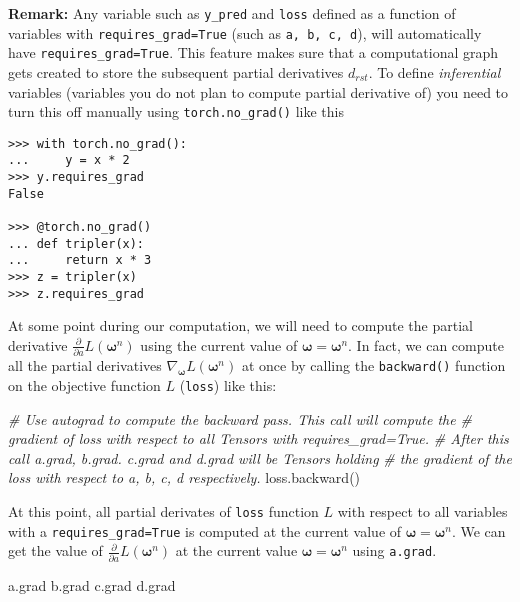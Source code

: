 \documentclass[
]{article}
\newenvironment{Shaded}{}{}
\newcommand{\CommentTok}[1]{\textcolor[rgb]{0.38,0.63,0.69}{\textit{#1}}}
\newcommand{\NormalTok}[1]{#1}
\newcommand{\1}{\boldsymbol{1}}
\begin{document}
\textbf{Remark:} Any variable such as \texttt{y\_pred} and \texttt{loss}
defined as a function of variables with \texttt{requires\_grad=True}
(such as \texttt{a,\ b,\ c,\ d}), will automatically have
\texttt{requires\_grad=True}. This feature makes sure that a
computational graph gets created to store the subsequent partial
derivatives \(d_{rst}\). To define \emph{inferential} variables
(variables you do not plan to compute partial derivative of) you need to
turn this off manually using \texttt{torch.no\_grad()} like this

\begin{verbatim}
>>> with torch.no_grad():
...     y = x * 2
>>> y.requires_grad
False

>>> @torch.no_grad()
... def tripler(x):
...     return x * 3
>>> z = tripler(x)
>>> z.requires_grad
\end{verbatim}

At some point during our computation, we will need to compute the
partial derivative
\(\frac{\partial}{\partial a}L(\boldsymbol{\omega}^n)\) using the
current value of \(\boldsymbol{\omega}= \boldsymbol{\omega}^n\). In
fact, we can compute all the partial derivatives
\(\nabla_{\boldsymbol{\omega}} L(\boldsymbol{\omega}^n)\) at once by
calling the \texttt{backward()} function on the objective function \(L\)
(\texttt{loss}) like this:

\begin{Shaded}
\begin{Highlighting}[]
\CommentTok{\# Use autograd to compute the backward pass. This call will compute the}
\CommentTok{\# gradient of loss with respect to all Tensors with requires\_grad=True.}
\CommentTok{\# After this call a.grad, b.grad. c.grad and d.grad will be Tensors holding}
\CommentTok{\# the gradient of the loss with respect to a, b, c, d respectively.}
\NormalTok{loss.backward()}
\end{Highlighting}
\end{Shaded}

At this point, all partial derivates of \texttt{loss} function \(L\)
with respect to all variables with a \texttt{requires\_grad=True} is
computed at the current value of
\(\boldsymbol{\omega}= \boldsymbol{\omega}^n\). We can get the value of
\(\frac{\partial}{\partial a}L(\boldsymbol{\omega}^n)\) at the current
value \(\boldsymbol{\omega}= \boldsymbol{\omega}^n\) using
\texttt{a.grad}.

\begin{Shaded}
\begin{Highlighting}[]
\NormalTok{a.grad}
\NormalTok{b.grad}
\NormalTok{c.grad}
\NormalTok{d.grad}
\end{Highlighting}
\end{Shaded}
\end{document}
